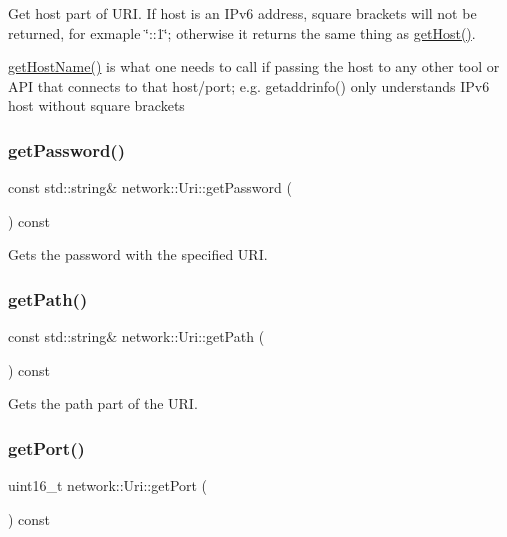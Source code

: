 Get host part of U\+RI. If host is an I\+Pv6 address, square brackets will not be returned, for exmaple \char`\"{}\+::1\char`\"{}; otherwise it returns the same thing as \hyperlink{classnetwork_1_1Uri_a993f91088a1d761721398970c206068d}{get\+Host()}.

\hyperlink{classnetwork_1_1Uri_a3d73311f4e6ff76f0b87854e8b2f7113}{get\+Host\+Name()} is what one needs to call if passing the host to any other tool or A\+PI that connects to that host/port; e.\+g. getaddrinfo() only understands I\+Pv6 host without square brackets \mbox{\label{classnetwork_1_1Uri_abfc199447ca8d6b4e19c079aee388585}} 
\subsubsection{\texorpdfstring{get\+Password()}{getPassword()}}
{\footnotesize\ttfamily const std\+::string\& network\+::\+Uri\+::get\+Password (\begin{DoxyParamCaption}{ }\end{DoxyParamCaption}) const\hspace{0.3cm}{\ttfamily [inline]}}

Gets the password with the specified U\+RI. \mbox{\label{classnetwork_1_1Uri_a3c3375f83145b6ee23a0e798f9c9b156}} 
\subsubsection{\texorpdfstring{get\+Path()}{getPath()}}
{\footnotesize\ttfamily const std\+::string\& network\+::\+Uri\+::get\+Path (\begin{DoxyParamCaption}{ }\end{DoxyParamCaption}) const\hspace{0.3cm}{\ttfamily [inline]}}

Gets the path part of the U\+RI. \mbox{\label{classnetwork_1_1Uri_ad6bf232516f3a22e0b9641b6a0fd2670}} 
\subsubsection{\texorpdfstring{get\+Port()}{getPort()}}
{\footnotesize\ttfamily uint16\+\_\+t network\+::\+Uri\+::get\+Port (\begin{DoxyParamCaption}{ }\end{DoxyParamCaption}) const\hspace{0.3cm}{\ttfamily [inline]}}

